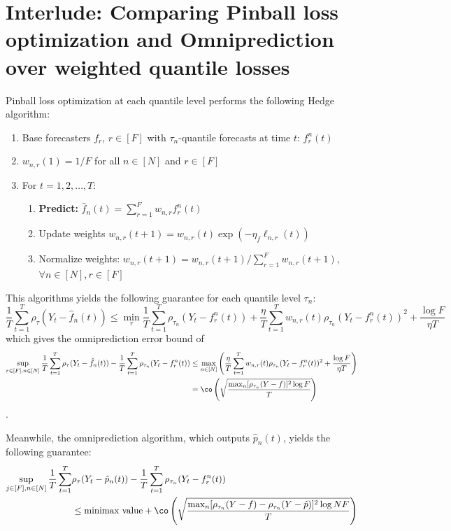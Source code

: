 \newpage
\section{Interlude: Comparing Pinball loss optimization and Omniprediction over weighted quantile losses}
Pinball loss optimization at each quantile level performs the following Hedge algorithm:

\begin{enumerate}
    \item Base forecasters $f_r$, $r \in [F]$ with $\tau_n$-quantile forecasts at time $t$: $f_r^n(t)$
    \item $w_{n,r}(1) = 1/F$ for all $n \in [N]$ and $r \in [F]$
    \item For $t = 1, 2, \ldots, T$:
    \begin{enumerate}
        \item \textbf{Predict:} $\hat{f}_{n}(t) = \sum_{r=1}^F w_{n,r} f_r^n(t)$
        \item Update weights $w_{n,r}(t+1) = w_{n,r}(t) \exp(-\eta_f \ell_{n,r}(t))$
        \item Normalize weights: $w_{n,r}(t+1) = w_{n,r}(t+1) / \sum_{r=1}^F w_{n,r}(t+1)$, $\forall n \in [N], r \in [F]$
    \end{enumerate}
\end{enumerate}

This algorithms yields the following guarantee for each quantile level $\tau_n$:
\[
\frac{1}{T}\sum_{t=1}^T \rho_\tau(Y_t - \hat{f}_{n}(t)) \leq \min_r \frac{1}{T}\sum_{t=1}^T \rho_{\tau_n}(Y_t - f_r^n(t)) + \frac{\eta}{T} \sum_{t=1}^T w_{n,r}(t) \rho_{\tau_n}(Y_t-f_r^n(t))^2 + \frac{\log F}{\eta T}
\]
which gives the omniprediction error bound of
\begin{align*}
    \sup_{r \in [F], n \in [N]} \frac{1}{T}\sum_{t=1}^T \rho_\tau(Y_t - \hat{f}_{n}(t)) - \frac{1}{T}\sum_{t=1}^T \rho_{\tau_n}(Y_t - f_r^n(t)) 
    &\leq \max_{n\in[N]} \left( \frac{\eta}{T} \sum_{t=1}^T w_{n,r}(t) \rho_{\tau_n}(Y_t-f_r^n(t))^2 + \frac{\log F}{\eta T} \right) \\
    &= \co\left(\sqrt{\frac{\max_n[\rho_{\tau_n}(Y-f)]^2\log F}{T}}\right)    
\end{align*}
. 

Meanwhile, the omniprediction algorithm, which outputs $\hat{p}_{n}(t)$, yields the following guarantee:
\begin{align*}
\sup_{j \in [F], n \in [N]} \frac{1}{T}\sum_{t=1}^T & \rho_\tau(Y_t - \hat{p}_{n}(t)) - \frac{1}{T}\sum_{t=1}^T \rho_{\tau_n}(Y_t - f_r^n(t)) \\
&\leq \text{minimax value} + \co\left(\sqrt{\frac{\max_n[\rho_{\tau_n}(Y-f) - \rho_{\tau_n}(Y-\hat{p})]^2\log NF}{T}}\right)
\end{align*}